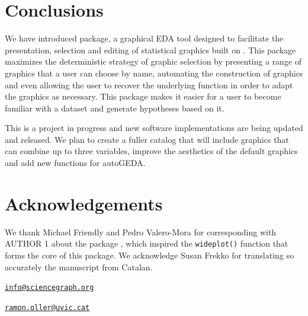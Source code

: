 \hypertarget{conclusions}{%
	\section{Conclusions}\label{conclusions}}

We have introduced  package, a graphical EDA tool designed
to facilitate the presentation, selection and editing of statistical
graphics built on . This package maximizes the
deterministic strategy of graphic selection by presenting a range of
graphics that a user can choose by name, automating the construction of
graphics and even allowing the user to recover the underlying
 function in order to adapt the graphics as necessary. This
package makes it easier for a user to become familiar with a dataset and
generate hypotheses based on it.

This is a project in progress and new software implementations are being 
updated and released.  We plan to create a fuller catalog that will include 
graphics that can combine up to three variables, improve the aesthetics of 
the default graphics and add new functions for autoGEDA.

\hypertarget{acknowledgements}{%
	\section{Acknowledgements}\label{acknowledgements}}

We thank Michael Friendly and Pedro Valero-Mora for corresponding with
AUTHOR 1 about the package , which inspired the
\texttt{wideplot()} function that forms the core of this package. We 
acknowledge Susan Frekko for translating so accurately the manuscript from 
Catalan.




\address{%
	Pere Millán-Martínez\\
	Servei Català de Trànsit\\
	Carrer Diputació, 355 08009 Barcelona, Spain\\
	Research Group on Methodology, Methods, Models and Outcomes of Health and Social Sciences ($M_{3}O$)\\
	Faculty of Health and Welfare Sciences\\
	Universitat de Vic - UCC\\
	Sagrada Família, 7 08500 Vic, Spain\\
	ORCID: 0000-0003-0879-9358\\
}
\href{mailto:info@sciencegraph.org}{\nolinkurl{info@sciencegraph.org}}

\address{%
	Ramon Oller\\
	Data Analysis and Modeling Research Group\\
	Departament d'Economia i Empresa\\
	Universitat de Vic - UCC\\
	Sagrada Família 7, 08500 Vic, Spain\\
	ORCID: 0000-0002-4333-0021\\
}
\href{mailto:ramon.oller@uvic.cat}{\nolinkurl{ramon.oller@uvic.cat}}
